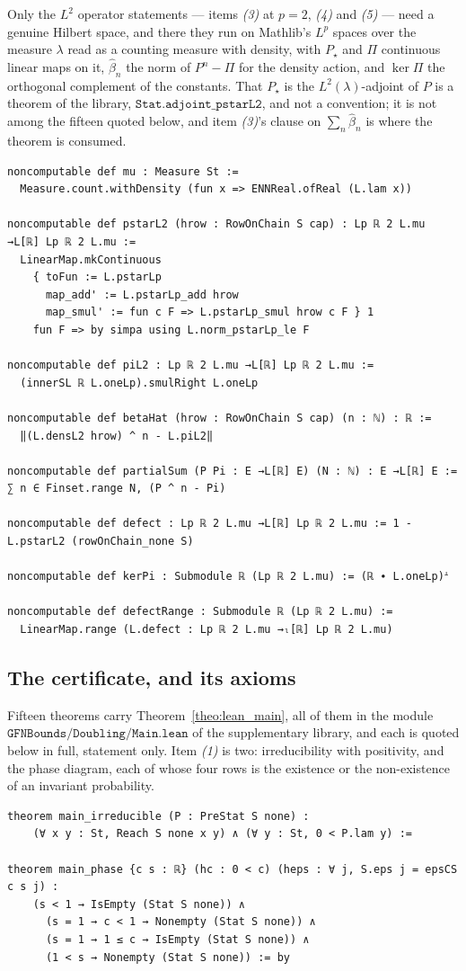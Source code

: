 Only the $L^2$ operator statements --- items \emph{(3)} at $p=2$, \emph{(4)} and \emph{(5)} ---
need a genuine Hilbert space, and there they run on Mathlib's $L^p$ spaces over the measure
$\lambda$ read as a counting measure with density, with $P_\star$ and $\Pi$ continuous linear
maps on it, $\widehat\beta_n$ the norm of $P^n-\Pi$ for the density action, and $\ker\Pi$ the
orthogonal complement of the constants. That $P_\star$ is the $L^2(\lambda)$-adjoint of $P$ is a
theorem of the library, $\texttt{Stat.adjoint\_pstarL2}$, and not a convention; it is not among
the fifteen quoted below, and item \emph{(3)}'s clause on $\sum_n\widehat\beta_n$ is where the
theorem is consumed.
\begin{lstlisting}[style=lean]
noncomputable def mu : Measure St :=
  Measure.count.withDensity (fun x => ENNReal.ofReal (L.lam x))

noncomputable def pstarL2 (hrow : RowOnChain S cap) : Lp ℝ 2 L.mu →L[ℝ] Lp ℝ 2 L.mu :=
  LinearMap.mkContinuous
    { toFun := L.pstarLp
      map_add' := L.pstarLp_add hrow
      map_smul' := fun c F => L.pstarLp_smul hrow c F } 1
    fun F => by simpa using L.norm_pstarLp_le F

noncomputable def piL2 : Lp ℝ 2 L.mu →L[ℝ] Lp ℝ 2 L.mu :=
  (innerSL ℝ L.oneLp).smulRight L.oneLp

noncomputable def betaHat (hrow : RowOnChain S cap) (n : ℕ) : ℝ :=
  ‖(L.densL2 hrow) ^ n - L.piL2‖

noncomputable def partialSum (P Pi : E →L[ℝ] E) (N : ℕ) : E →L[ℝ] E := ∑ n ∈ Finset.range N, (P ^ n - Pi)

noncomputable def defect : Lp ℝ 2 L.mu →L[ℝ] Lp ℝ 2 L.mu := 1 - L.pstarL2 (rowOnChain_none S)

noncomputable def kerPi : Submodule ℝ (Lp ℝ 2 L.mu) := (ℝ ∙ L.oneLp)ᗮ

noncomputable def defectRange : Submodule ℝ (Lp ℝ 2 L.mu) :=
  LinearMap.range (L.defect : Lp ℝ 2 L.mu →ₗ[ℝ] Lp ℝ 2 L.mu)
\end{lstlisting}

\subsection{The certificate, and its axioms}\label{sec:lean_certificate}

Fifteen theorems carry Theorem~\ref{theo:lean_main}, all of them in the module
$\texttt{GFNBounds/Doubling/Main.lean}$ of the supplementary library, and each is quoted below
in full, statement only. Item \emph{(1)} is two: irreducibility with positivity, and the phase
diagram, each of whose four rows is the existence or the non-existence of an invariant
probability.
\begin{lstlisting}[style=lean]
theorem main_irreducible (P : PreStat S none) :
    (∀ x y : St, Reach S none x y) ∧ (∀ y : St, 0 < P.lam y) :=

theorem main_phase {c s : ℝ} (hc : 0 < c) (heps : ∀ j, S.eps j = epsCS c s j) :
    (s < 1 → IsEmpty (Stat S none)) ∧
      (s = 1 → c < 1 → Nonempty (Stat S none)) ∧
      (s = 1 → 1 ≤ c → IsEmpty (Stat S none)) ∧
      (1 < s → Nonempty (Stat S none)) := by
\end{lstlisting}

